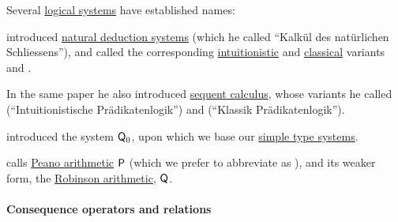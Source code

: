 \begin{remark}\label{rem:named_logical_systems}
  Several \hyperref[con:logical_system]{logical systems} have established names:
  \begin{itemize}
      introduced \hyperref[def:abstract_natural_deduction_system]{natural deduction systems} (which he called \enquote{Kalk\"ul des nat\"urlichen Schliessens}), and called the corresponding \hyperref[con:intuitionistic_logic]{intuitionistic} and \hyperref[con:classical_logic]{classical} variants  and .

    In the same paper he also introduced \hyperref[con:sequent_calculus]{sequent calculus}, whose variants he called  (\enquote{Intuitionistische Pr\"adikatenlogik}) and  (\enquote{Klassik Pr\"adikatenlogik}).

      introduced the system \( \textsf{Q}_0 \), upon which we base our \hyperref[def:simple_type_system]{simple type systems}.

      calls \hyperref[def:peano_arithmetic]{Peano arithmetic} \( \textsf{P} \) (which we prefer to abbreviate as ), and its weaker form, the \hyperref[def:peano_arithmetic]{Robinson arithmetic}, \( \textsf{Q} \).
  \end{itemize}
\end{remark}

\paragraph{Consequence operators and relations}

